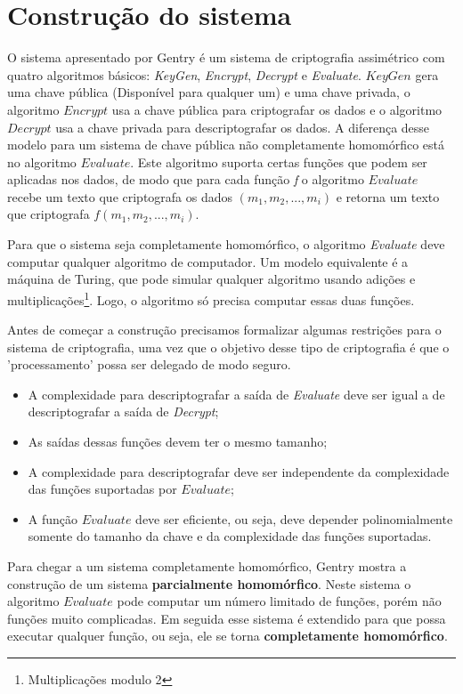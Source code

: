 \chapter{Construção do sistema}
\label{construcao}
O sistema apresentado por Gentry é um sistema de criptografia assimétrico com quatro algoritmos básicos: \textit{KeyGen}, \textit{Encrypt}, \textit{Decrypt} e \textit{Evaluate}. $KeyGen$ gera uma chave pública (Disponível para qualquer um) e uma chave privada, o algoritmo $Encrypt$ usa a chave pública para criptografar os dados e o algoritmo $Decrypt$ usa a chave privada para descriptografar os dados. A diferença desse modelo para um sistema de chave pública não completamente homomórfico está no algoritmo $Evaluate$. Este algoritmo suporta certas funções que podem ser aplicadas nos dados, de modo que para cada função \textit{f} o algoritmo $Evaluate$ recebe um texto que criptografa os dados $(m_1, m_2, ..., m_i)$ e retorna um texto que criptografa $f(m_1, m_2, ..., m_i)$.

Para que o sistema seja completamente homomórfico, o algoritmo \textit{Evaluate} deve computar qualquer algoritmo de computador. Um modelo equivalente é a máquina de Turing, que pode simular qualquer algoritmo usando adições e multiplicações\footnote{Multiplicações modulo 2}. Logo, o algoritmo só precisa computar essas duas funções.

Antes de começar a construção precisamos formalizar algumas restrições para o sistema de criptografia, uma vez que o objetivo desse tipo de criptografia é que o 'processamento' possa ser delegado de modo seguro.
\begin{itemize}
	\item A complexidade para descriptografar a saída de \textit{Evaluate} deve ser igual a de descriptografar a saída de \textit{Decrypt};
	\item As saídas dessas funções devem ter o mesmo tamanho;
	\item A complexidade para descriptografar deve ser independente da complexidade das funções suportadas por $Evaluate$;
	\item A função $Evaluate$ deve ser eficiente, ou seja, deve depender polinomialmente somente do tamanho da chave e da complexidade das funções suportadas.
\end{itemize}

Para chegar a um sistema completamente homomórfico, Gentry mostra a construção de um sistema \textbf{parcialmente homomórfico}. Neste sistema o algoritmo $Evaluate$ pode computar um número limitado de funções, porém não funções muito complicadas. Em seguida esse sistema é extendido para que possa executar qualquer função, ou seja, ele se torna \textbf{completamente homomórfico}.

